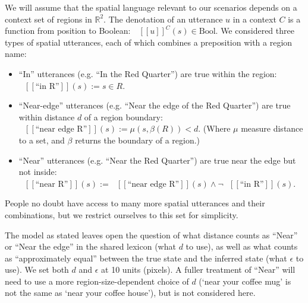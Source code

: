 \documentclass[10pt,letterpaper]{article}
\newcommand{\denote}[1]{\mbox{ $[\![ #1 ]\!]$}}
\begin{document}
We will assume that the spatial language relevant to our scenarios depends on a context set of regions in $\mathbb{R}^2$.
The denotation of an utterance $u$ in a context $C$ is a function from position to Boolean: $\denote{u}^C(s)\in \text{Bool}$.
We considered three types of spatial utterances, each of which combines a preposition with a region name: 
\begin{itemize}
\item ``In'' utterances (e.g. ``In the Red Quarter'') are true within the region: $\denote{\text{``in R''}}(s) := s\in R$.
\item ``Near-edge'' utterances (e.g. ``Near the edge of the Red Quarter'') are true within distance $d$ of a region boundary: $\denote{\text{``near edge R''}}(s) := \mu(s,\beta(R))<d$. (Where $\mu$ measure distance to a set, and $\beta$ returns the boundary of a region.)
\item ``Near'' utterances (e.g. ``Near the Red Quarter'') are true near the edge but not inside: $\denote{\text{``near R''}}(s) := 
\denote{\text{``near edge R''}}(s) \wedge \neg \denote{\text{``in R''}}(s)$.
\end{itemize}
People no doubt have access to many more spatial utterances and their combinations, but we restrict ourselves to this set for simplicity. 






The model as stated leaves open the question of what distance counts as ``Near'' or ``Near the edge'' in the shared lexicon (what $d$ to use), as well as what counts as ``approximately equal'' between the true state and the inferred state (what $\epsilon$ to use). We set both $d$ and $\epsilon$ at 10 units (pixels). A fuller treatment of ``Near'' will need to use a more region-size-dependent choice of $d$ (`near your coffee mug' is not the same as `near your coffee house'), but is not considered here. 
\end{document}
